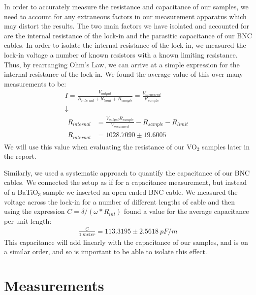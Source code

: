 \documentclass[%
 reprint,
 amsmath,amssymb,
 aps,
 pra,
]{revtex4-1}
\begin{document}
In order to accurately measure the resistance and capacitance of our samples, we need to account for any extraneous factors in our measurement apparatus which may distort the results. The two main factors we have isolated and accounted for are the internal resistance of the lock-in and the parasitic capacitance of our BNC cables. In order to isolate the internal resistance of the lock-in, we measured the lock-in voltage a number of known resistors with a known limiting resistance. Thus, by rearranging Ohm's Law, we can arrive at a simple expression for the internal resistance of the lock-in. We found the average value of this over many measurements to be:
\begin{gather}
	I = \frac{V_{output}}{R_{internal} + R_{limit} + R_{sample}} = \frac{V_{measured}}{R_{sample}} \nonumber \\
	\downarrow \nonumber \\
	\begin{align}
		R_{internal} 		& = \frac{V_{output}R_{sample}}{V_{measured}} - R_{sample} - R_{limit} \nonumber \\
		\bar{R}_{internal} 	& = 1028.7090 \pm 19.6005 \nonumber
	\end{align}
\end{gather}
We will use this value when evaluating the resistance of our VO$_2$ samples later in the report.

Similarly, we used a systematic approach to quantify the capacitance of our BNC cables. We connected the setup as if for a capacitance measurement, but instead of a BaTiO$_3$ sample we inserted an open-ended BNC cable. We measured the voltage across the lock-in for a number of different lengths of cable and then using the expression $C = \delta/(\omega*R_{int})$ found a value for the average capacitance per unit length:
\begin{gather}
	\frac{C}{1~meter} = 113.3195 \pm 2.5618~pF/m \nonumber
\end{gather}
This capacitance will add linearly with the capacitance of our samples, and is on a similar order, and so is important to be able to isolate this effect.

\section{Measurements}
\end{document}

